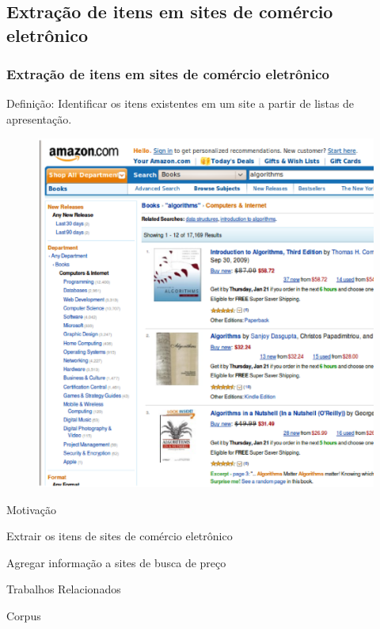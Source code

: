\documentclass{beamer}
\newenvironment{my_itemize}{
\begin{itemize}
  \setlength{\itemsep}{5pt}
  \setlength{\parskip}{2pt}
  \setlength{\parsep}{3pt}
}{\end{itemize}}
\begin{document}
\begin{frame}[allowframebreaks]
  \subsection{Extração de itens em sites de comércio eletrônico}
  \frametitle{Extração de itens em sites de comércio eletrônico}

  \begin{my_itemize}

    \item Definição: Identificar os itens existentes em um site a partir de listas de apresentação.
\begin{figure}[h!]
    \center
    \includegraphics[scale=0.25]{img/ce}
\end{figure}

\newpage
    \item Motivação
    \begin{my_itemize}
    \item Extrair os itens de sites de comércio eletrônico
    \item Agregar informação a sites de busca de preço
    \end{my_itemize}

    \item {\color{yellow}Trabalhos Relacionados}

    \item {\color{yellow}Corpus}

  \end{my_itemize}
\end{frame}
\end{document}
